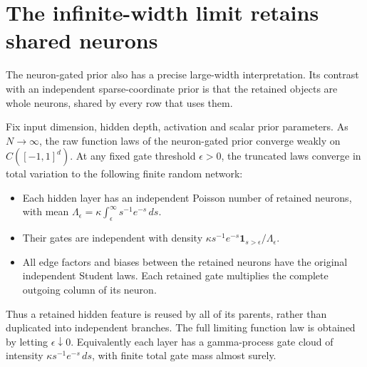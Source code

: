\section{The infinite-width limit retains shared neurons}
\label{sec:ard-wide-limit}
The neuron-gated prior also has a precise large-width interpretation. Its contrast with an independent sparse-coordinate prior is that the retained objects are whole neurons, shared by every row that uses them.

\begin{proposition}
\label{prop:ard-wide-limit}
Fix input dimension, hidden depth, activation and scalar prior parameters. As $N\to\infty$, the raw function laws of the neuron-gated prior converge weakly on $C([-1,1]^d)$. At any fixed gate threshold $\epsilon>0$, the truncated laws converge in total variation to the following finite random network:
\begin{itemize}
\item Each hidden layer has an independent Poisson number of retained neurons, with mean
$\Lambda_\epsilon=\kappa\int_\epsilon^\infty s^{-1}e^{-s}\,ds$.
\item Their gates are independent with density
$\kappa s^{-1}e^{-s}\mathbf1_{s>\epsilon}/\Lambda_\epsilon$.
\item All edge factors and biases between the retained neurons have the original independent Student laws. Each retained gate multiplies the complete outgoing column of its neuron.
\end{itemize}
Thus a retained hidden feature is reused by all of its parents, rather than duplicated into independent branches. The full limiting function law is obtained by letting $\epsilon\downarrow0$. Equivalently each layer has a gamma-process gate cloud of intensity $\kappa s^{-1}e^{-s}\,ds$, with finite total gate mass almost surely.
\end{proposition}
